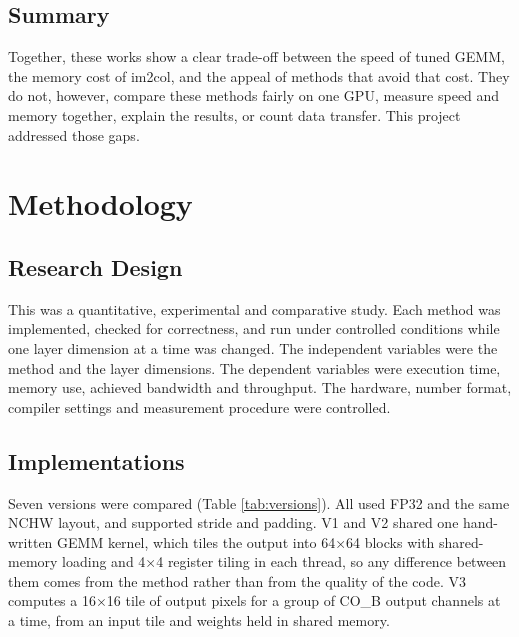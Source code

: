 \documentclass[12pt,a4paper]{article}
\begin{document}
\subsection{Summary}
Together, these works show a clear trade-off between the speed of tuned GEMM, the memory cost of im2col, and the appeal of methods that avoid that cost. They do not, however, compare these methods fairly on one GPU, measure speed and memory together, explain the results, or count data transfer. This project addressed those gaps.

\section{Methodology}
\subsection{Research Design}
This was a quantitative, experimental and comparative study. Each method was implemented, checked for correctness, and run under controlled conditions while one layer dimension at a time was changed. The independent variables were the method and the layer dimensions. The dependent variables were execution time, memory use, achieved bandwidth and throughput. The hardware, number format, compiler settings and measurement procedure were controlled.

\subsection{Implementations}
Seven versions were compared (Table \ref{tab:versions}). All used FP32 and the same NCHW layout, and supported stride and padding. V1 and V2 shared one hand-written GEMM kernel, which tiles the output into 64×64 blocks with shared-memory loading and 4×4 register tiling in each thread, so any difference between them comes from the method rather than from the quality of the code. V3 computes a 16×16 tile of output pixels for a group of CO\_B output channels at a time, from an input tile and weights held in shared memory.
\end{document}

